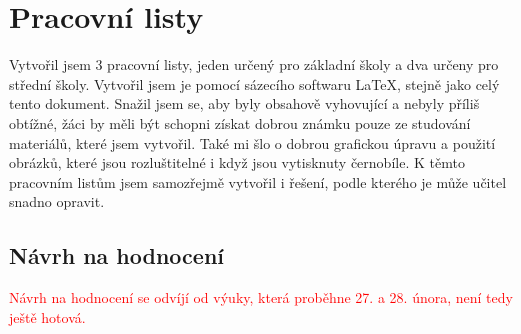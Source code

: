 \section{Pracovní listy}
{Vytvořil jsem 3 pracovní listy, jeden určený pro základní školy a dva určeny pro střední školy. Vytvořil jsem je pomocí sázecího softwaru \LaTeX, stejně jako celý tento dokument. Snažil jsem se, aby byly obsahově vyhovující a nebyly příliš obtížné, žáci by měli být schopni získat dobrou známku pouze ze studování materiálů, které jsem vytvořil. Také mi šlo o dobrou grafickou úpravu a použití obrázků, které jsou rozluštitelné i když jsou vytisknuty černobíle.}\odst
{K těmto pracovním listům jsem samozřejmě vytvořil i řešení, podle kterého je může učitel snadno opravit.}
\subsection{Návrh na hodnocení}
\textcolor{red}{Návrh na hodnocení se odvíjí od výuky, která proběhne 27. a 28. února, není tedy ještě hotová.}